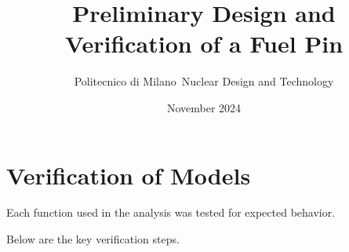 \documentclass[11pt,a4paper,twoside]{article}
\title{Preliminary Design and Verification of a Fuel Pin}
\author{Politecnico di Milano\ Nuclear Design and Technology}
\date{November 2024}
\begin{document}
\maketitle

\tableofcontents
\newpage


\section{Verification of Models}
Each function used in the analysis was tested for expected behavior.

Below are the key verification steps.


\appendix
\end{document}
